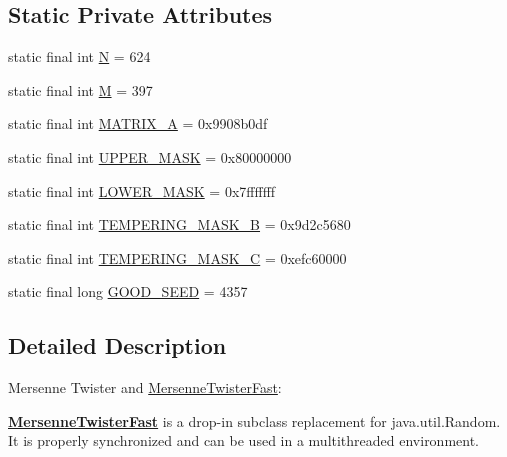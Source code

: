 \subsection*{Static Private Attributes}
\begin{DoxyCompactItemize}
\item 
static final int \hyperlink{classjenes_1_1utils_1_1_mersenne_twister_fast_a7d764d0e1d79a1a64977acd0d4e6d8ae}{N} = 624
\item 
static final int \hyperlink{classjenes_1_1utils_1_1_mersenne_twister_fast_a7230af540751efe08187e45c15e4e9f8}{M} = 397
\item 
static final int \hyperlink{classjenes_1_1utils_1_1_mersenne_twister_fast_a81b66e24b88e9d3338c3fa84c1ec2421}{M\-A\-T\-R\-I\-X\-\_\-\-A} = 0x9908b0df
\item 
static final int \hyperlink{classjenes_1_1utils_1_1_mersenne_twister_fast_acb11c6167b19e7e19be9337e5f389c99}{U\-P\-P\-E\-R\-\_\-\-M\-A\-S\-K} = 0x80000000
\item 
static final int \hyperlink{classjenes_1_1utils_1_1_mersenne_twister_fast_aa4a16f54a6dd22b49cede7adbfad7a24}{L\-O\-W\-E\-R\-\_\-\-M\-A\-S\-K} = 0x7fffffff
\item 
static final int \hyperlink{classjenes_1_1utils_1_1_mersenne_twister_fast_a1ef24f834e07e21daa774f923a261cdc}{T\-E\-M\-P\-E\-R\-I\-N\-G\-\_\-\-M\-A\-S\-K\-\_\-\-B} = 0x9d2c5680
\item 
static final int \hyperlink{classjenes_1_1utils_1_1_mersenne_twister_fast_a54b88e85493a22103f45b6e380c9bf79}{T\-E\-M\-P\-E\-R\-I\-N\-G\-\_\-\-M\-A\-S\-K\-\_\-\-C} = 0xefc60000
\item 
static final long \hyperlink{classjenes_1_1utils_1_1_mersenne_twister_fast_a7c4e79e22cfb451e328e35c95ab5176b}{G\-O\-O\-D\-\_\-\-S\-E\-E\-D} = 4357
\end{DoxyCompactItemize}


\subsection{Detailed Description}
Mersenne Twister and \hyperlink{classjenes_1_1utils_1_1_mersenne_twister_fast}{Mersenne\-Twister\-Fast}\-: 

{\bfseries \hyperlink{classjenes_1_1utils_1_1_mersenne_twister_fast}{Mersenne\-Twister\-Fast}} is a drop-\/in subclass replacement for java.\-util.\-Random. It is properly synchronized and can be used in a multithreaded environment.

